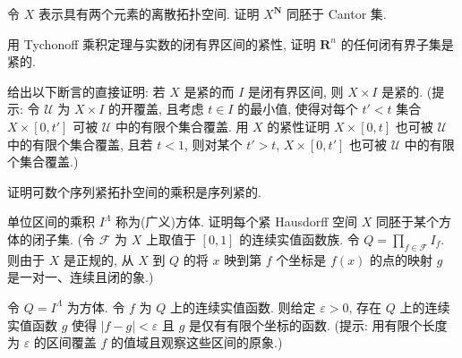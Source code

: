 \documentclass[../../main.tex]{subfiles}
\begin{document}
\begin{exercise}\label{exercise:ch12-18}
令 $X$ 表示具有两个元素的离散拓扑空间. 证明 $X^{\mathbf{N}}$ 同胚于 Cantor 集.
\end{exercise}

\begin{exercise}\label{exercise:ch12-19}
用 Tychonoff 乘积定理与实数的闭有界区间的紧性, 证明 $\mathbf{R}^{n}$ 的任何闭有界子集是紧的.
\end{exercise}

\begin{exercise}\label{exercise:ch12-20}
给出以下断言的直接证明: 若 $X$ 是紧的而 $I$ 是闭有界区间, 则 $X\times I$ 是紧的. (提示: 令 $\mathcal{U}$ 为 $X\times I$ 的开覆盖, 且考虑 $t\in I$ 的最小值, 使得对每个 $t'<t$ 集合 $X\times[0,t']$ 可被 $\mathcal{U}$ 中的有限个集合覆盖. 用 $X$ 的紧性证明 $X\times[0,t]$ 也可被 $\mathcal{U}$ 中的有限个集合覆盖, 且若 $t<1$, 则对某个 $t'>t$, $X\times[0,t']$ 也可被 $\mathcal{U}$ 中的有限个集合覆盖.)
\end{exercise}

\begin{exercise}\label{exercise:ch12-21}
证明可数个序列紧拓扑空间的乘积是序列紧的.
\end{exercise}

\begin{exercise}\label{exercise:ch12-22}
单位区间的乘积 $I^{\Lambda}$ 称为(广义)方体. 证明每个紧 Hausdorff 空间 $X$ 同胚于某个方体的闭子集. (令 $\mathcal{F}$ 为 $X$ 上取值于 $[0,1]$ 的连续实值函数族. 令 $Q=\prod_{f\in\mathcal{F}}I_{f}$. 则由于 $X$ 是正规的, 从 $X$ 到 $Q$ 的将 $x$ 映到第 $f$ 个坐标是 $f(x)$ 的点的映射 $g$ 是一对一、连续且闭的象.)
\end{exercise}

\begin{exercise}\label{exercise:ch12-23}
令 $Q=I^{\Lambda}$ 为方体. 令 $f$ 为 $Q$ 上的连续实值函数. 则给定 $\varepsilon>0$, 存在 $Q$ 上的连续实值函数 $g$ 使得 $|f-g|<\varepsilon$ 且 $g$ 是仅有有限个坐标的函数. (提示: 用有限个长度为 $\varepsilon$ 的区间覆盖 $f$ 的值域且观察这些区间的原象.)
\end{exercise}
\end{document}
